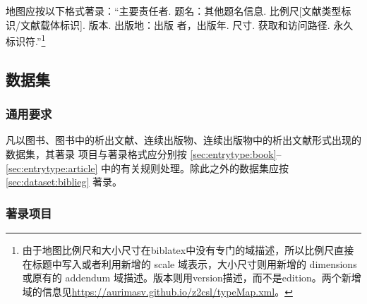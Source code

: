 \documentclass[twoside]{article}%
\begin{document}
地图应按以下格式著录：“主要责任者. 题名：其他题名信息. 比例尺[文献类型标识/文献载体标识]. 版本. 出版地：出版
者，出版年. 尺寸. 获取和访问路径. 永久标识符.”\footnote{由于地图比例尺和大小尺寸在biblatex中没有专门的域描述，所以比例尺直接在标题中写入或者利用新增的 scale 域表示，大小尺寸则用新增的 dimensions 或原有的 addendum 域描述。版本则用version描述，而不是edition。两个新增域的信息见\url{https://aurimasv.github.io/z2csl/typeMap.xml}。}





\subsection{数据集}\label{sec:entrytype:dataset}

\subsubsection{通用要求}

凡以图书、图书中的析出文献、连续出版物、连续出版物中的析出文献形式出现的数据集，其著录
项目与著录格式应分别按 \ref{sec:entrytype:book}--\ref{sec:entrytype:article} 中的有关规则处理。除此之外的数据集应按 \ref{sec:dataset:biblieg} 著录。

\subsubsection{著录项目}
\end{document}
